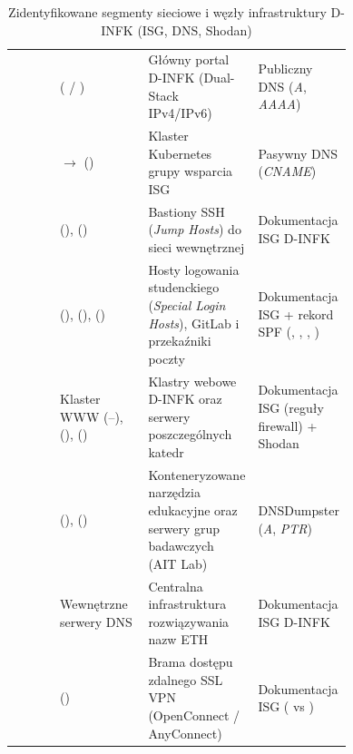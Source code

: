 \begin{table}[H]
\caption{Zidentyfikowane segmenty sieciowe i węzły infrastruktury D-INFK (ISG, DNS, Shodan)}
\label{tab:dinfk-podsieci}
\centering\tablefont
\begin{tabularx}{\linewidth}{L{0.22\linewidth} L{0.28\linewidth} L{0.24\linewidth} Y}
\toprule
{} &  &  &  \\
\midrule
{} \newline {} &  ( / ) & Główny portal D-INFK (Dual-Stack IPv4/IPv6) & Publiczny DNS (\textit{A}, \textit{AAAA}) \\
\midrule
{} &  $\rightarrow$  () & Klaster Kubernetes grupy wsparcia ISG & Pasywny DNS (\textit{CNAME}) \\
\midrule
{} &  (),  () & Bastiony SSH (\textit{Jump Hosts}) do sieci wewnętrznej & Dokumentacja ISG D-INFK \\
\midrule
{} &  (),  (),  () & Hosty logowania studenckiego (\textit{Special Login Hosts}), GitLab i przekaźniki poczty & Dokumentacja ISG + rekord SPF (, , , ) \\
\midrule
{} & Klaster WWW (--),  (),  () & Klastry webowe D-INFK oraz serwery poszczególnych katedr & Dokumentacja ISG (reguły firewall) + Shodan \\
\midrule
{} \newline {} &  (),  () & Konteneryzowane narzędzia edukacyjne oraz serwery grup badawczych (AIT Lab) & DNSDumpster (\textit{A}, \textit{PTR}) \\
\midrule
{} \newline {} & Wewnętrzne serwery DNS & Centralna infrastruktura rozwiązywania nazw ETH & Dokumentacja ISG D-INFK \\
\midrule
{} &  () & Brama dostępu zdalnego SSL VPN (OpenConnect / AnyConnect) & Dokumentacja ISG ( vs ) \\

\end{tabularx}
\end{table}
